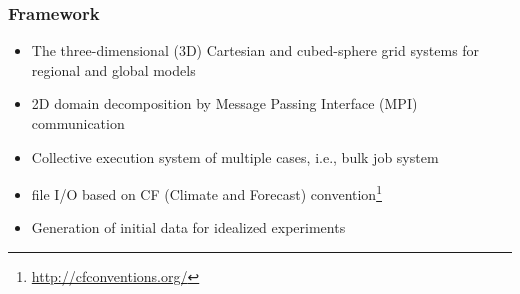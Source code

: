 \subsubsection{Framework}
\begin{itemize}
 \item The three-dimensional (3D) Cartesian and cubed-sphere grid systems for regional and global models
 \item 2D domain decomposition by Message Passing Interface (MPI) communication
 \item Collective execution system of multiple cases, i.e., bulk job system
 \item \netcdf file I/O based on CF (Climate and Forecast) convention\footnote{\url{http://cfconventions.org/}}
 \item Generation of initial data for idealized experiments
\end{itemize}

